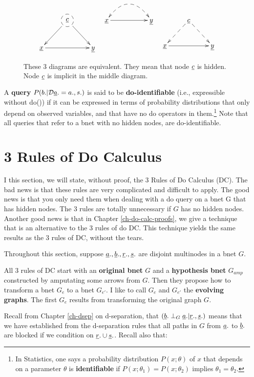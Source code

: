 \begin{figure}[h!]
$$\xymatrix{
&*++[F-o]{\rvc}\ar[dl]\ar[dr]
\\
\rvx\ar[rr]&&\rvy
}
\;\;\;
\xymatrix{
\rvx\ar@{-->}@{<-->}@/^2pc/[rr]
\ar[rr]&&\rvy
}
\;\;\;
\xymatrix{
&\rvc\ar@{-->}[dl]\ar@{-->}[dr]
\\
\rvx\ar[rr]&&\rvy
}$$
\caption{
These 3 diagrams
are equivalent.
They
mean that node $\rvc$
is hidden.
Node $\rvc$
is implicit
in the
middle diagram.}
\label{fig-hidden-dashes}
\end{figure}

A {\bf query} $P(b.|\cald \rva.=a., s.)$
is said to be {\bf do-identifiable}
(i.e., expressible without do())
if it can be
expressed in terms of
probability distributions
that only
depend on observed
variables, and that
have no do operators
in them.\footnote{In Statistics,
one says a probability
distribution $P(x;\theta)$
of $x$ that depends on a parameter
$\theta$ is {\bf identifiable}
if  $P(x;\theta_1)=P(x;\theta_2)$
implies $\theta_1=\theta_2$.}
Note that all queries that refer to a bnet 
with no hidden nodes, are do-identifiable.



\section{3 Rules of Do Calculus}

I this section, we will state, without proof,
the 3 Rules of Do Calculus (DC). The bad news is that these rules 
are very complicated and difficult
to apply. The good news is that you only need them 
when dealing with a do query on
a bnet G that has hidden nodes. The 3 rules are totally 
unnecessary if $G$ has no hidden nodes.
Another good news is that in Chapter \ref{ch-do-calc-proofs}, we give 
a technique that is
an alternative to the 3 rules 
of do DC. This technique yields the same
results as  the 3 rules of DC, without
the tears.

Throughout
this section, suppose
$\rva., \rvb., \rvr.,
\rvs.$ are disjoint
multinodes in a bnet $G$.


All 3 rules of DC start with an
{\bf original bnet} $G$ and a {\bf hypothesis bnet}
$G_{amp}$ constructed by amputating
some arrows from $G$. Then they propose how
to transform a bnet $G_e$ to a bnet $G_{e'}$. I like to call 
$G_e$ and $G_{e'}$ the {\bf evolving graphs}. The first $G_e$ 
results from transforming the  original graph $G$.


Recall
from Chapter \ref{ch-dsep}
on d-separation,
that  $(\rvb.\perp_G \rva.|\rvr., \rvs.)$
means that
we have established
from the d-separation
rules that
all
paths in $G$
 from
$\rva.$ to
$\rvb.$
are blocked
if we condition
on $\rvr.\cup \rvs.$.
Recall also that:

